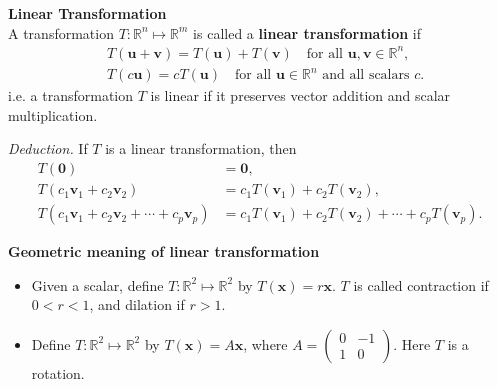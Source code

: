 \documentclass[10pt, a4paper]{article}
\begin{document}
\begin{definition} 
    \textbf{Linear Transformation}\\
    A transformation $T: \mathbb{R}^n \mapsto \mathbb{R}^m$ is called a \textbf{linear transformation} if
    \begin{align*}
        &T(\mathbf{u}+\mathbf{v})=T(\mathbf{u})+T(\mathbf{v}) \quad \text{for all } \mathbf{u}, \mathbf{v} \in \mathbb{R}^n, \\
        &T(c\mathbf{u})=cT(\mathbf{u}) \quad \text{for all } \mathbf{u} \in \mathbb{R}^n \text{ and all scalars } c.
    \end{align*}
    i.e. a transformation $T$ is linear if it preserves vector addition and scalar multiplication.
\end{definition}

\indent \textit{Deduction.} If $T$ is a linear transformation, then 
\begin{align*}
    T(\mathbf{0})&=\mathbf{0}, \\
    T(c_1\mathbf{v}_1+c_2\mathbf{v}_2)&=c_1T(\mathbf{v}_1)+c_2T(\mathbf{v}_2), \\
    T(c_1\mathbf{v}_1+c_2\mathbf{v}_2+\cdots+c_p\mathbf{v}_p)&=c_1T(\mathbf{v}_1)+c_2T(\mathbf{v}_2)+\cdots+c_pT(\mathbf{v}_p).
\end{align*}

\begin{example}
    \textbf{Geometric meaning of linear transformation}\\
    \begin{itemize}
        \item  Given a scalar, define $T: \mathbb{R}^2\mapsto\mathbb{R}^2$ by $T(\mathbf{x})=r\mathbf{x}$. $T$ is called contraction if $0<r<1$, and dilation if $r>1$.
        \item Define $T: \mathbb{R}^2\mapsto\mathbb{R}^2$ by $T(\mathbf{x})=A\mathbf{x}$, where $A=\begin{pmatrix} 0 & -1 \\ 1 & 0 \end{pmatrix}$. Here $T$ is a rotation.
    \end{itemize}
\end{example}
\end{document}
